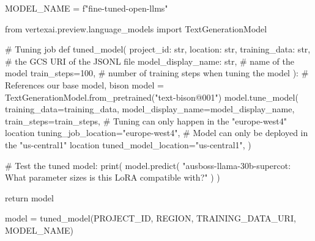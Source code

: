 \documentclass[
  letterpaper,
  DIV=11,
  numbers=noendperiod]{scrreprt}
\newenvironment{Shaded}{\begin{snugshade}}{\end{snugshade}}
\newcommand{\BuiltInTok}[1]{\textcolor[rgb]{0.00,0.23,0.31}{#1}}
\newcommand{\CommentTok}[1]{\textcolor[rgb]{0.37,0.37,0.37}{#1}}
\newcommand{\ControlFlowTok}[1]{\textcolor[rgb]{0.00,0.23,0.31}{#1}}
\newcommand{\DecValTok}[1]{\textcolor[rgb]{0.68,0.00,0.00}{#1}}
\newcommand{\ImportTok}[1]{\textcolor[rgb]{0.00,0.46,0.62}{#1}}
\newcommand{\KeywordTok}[1]{\textcolor[rgb]{0.00,0.23,0.31}{#1}}
\newcommand{\NormalTok}[1]{\textcolor[rgb]{0.00,0.23,0.31}{#1}}
\newcommand{\OperatorTok}[1]{\textcolor[rgb]{0.37,0.37,0.37}{#1}}
\newcommand{\SpecialStringTok}[1]{\textcolor[rgb]{0.13,0.47,0.30}{#1}}
\newcommand{\StringTok}[1]{\textcolor[rgb]{0.13,0.47,0.30}{#1}}
\begin{document}
\begin{Shaded}
\begin{Highlighting}[]
\NormalTok{MODEL\_NAME }\OperatorTok{=} \SpecialStringTok{f"fine{-}tuned{-}open{-}llms"}
\end{Highlighting}
\end{Shaded}

\begin{Shaded}
\begin{Highlighting}[]
\ImportTok{from}\NormalTok{ vertexai.preview.language\_models }\ImportTok{import}\NormalTok{ TextGenerationModel}

\CommentTok{\# Tuning job}
\KeywordTok{def}\NormalTok{ tuned\_model(}
\NormalTok{    project\_id: }\BuiltInTok{str}\NormalTok{,}
\NormalTok{    location: }\BuiltInTok{str}\NormalTok{,}
\NormalTok{    training\_data: }\BuiltInTok{str}\NormalTok{, }\CommentTok{\# the GCS URI of the JSONL file}
\NormalTok{    model\_display\_name: }\BuiltInTok{str}\NormalTok{, }\CommentTok{\# name of the model}
\NormalTok{    train\_steps}\OperatorTok{=}\DecValTok{100}\NormalTok{, }\CommentTok{\# number of training steps when tuning the model}
\NormalTok{):}
    \CommentTok{\# References our base model, bison}
\NormalTok{    model }\OperatorTok{=}\NormalTok{ TextGenerationModel.from\_pretrained(}\StringTok{"text{-}bison@001"}\NormalTok{)}
\NormalTok{    model.tune\_model(}
\NormalTok{        training\_data}\OperatorTok{=}\NormalTok{training\_data,}
\NormalTok{        model\_display\_name}\OperatorTok{=}\NormalTok{model\_display\_name,}
\NormalTok{        train\_steps}\OperatorTok{=}\NormalTok{train\_steps,}
        \CommentTok{\# Tuning can only happen in the "europe{-}west4" location}
\NormalTok{        tuning\_job\_location}\OperatorTok{=}\StringTok{"europe{-}west4"}\NormalTok{,}
        \CommentTok{\# Model can only be deployed in the "us{-}central1" location}
\NormalTok{        tuned\_model\_location}\OperatorTok{=}\StringTok{"us{-}central1"}\NormalTok{,}
\NormalTok{    )}

    \CommentTok{\# Test the tuned model:}
    \BuiltInTok{print}\NormalTok{(}
\NormalTok{        model.predict(}
            \StringTok{"ausboss{-}llama{-}30b{-}supercot: What parameter sizes is this LoRA compatible with?"}
\NormalTok{        )}
\NormalTok{    )}

    \ControlFlowTok{return}\NormalTok{ model}
\end{Highlighting}
\end{Shaded}

\begin{Shaded}
\begin{Highlighting}[]
\NormalTok{model }\OperatorTok{=}\NormalTok{ tuned\_model(PROJECT\_ID, REGION, TRAINING\_DATA\_URI, MODEL\_NAME)}
\end{Highlighting}
\end{Shaded}
\end{document}
